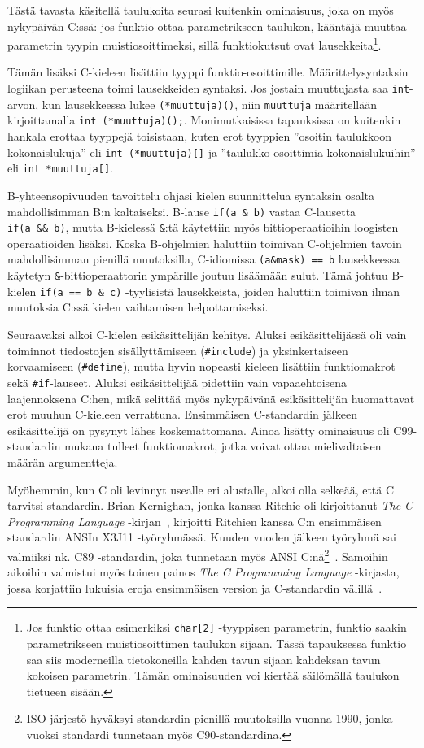Tästä tavasta käsitellä taulukoita seurasi kuitenkin ominaisuus, joka on myös
nykypäivän C:ssä: jos funktio ottaa parametrikseen taulukon, kääntäjä muuttaa
parametrin tyypin muistiosoittimeksi, sillä funktiokutsut ovat
lausekkeita\footnote{Jos funktio ottaa esimerkiksi \texttt{char[2]} -tyyppisen
parametrin, funktio saakin parametrikseen muistiosoittimen taulukon sijaan.
Tässä tapauksessa funktio saa siis moderneilla tietokoneilla kahden tavun
sijaan kahdeksan tavun kokoisen parametrin. Tämän ominaisuuden voi kiertää
säilömällä taulukon tietueen sisään.}.

Tämän lisäksi C-kieleen lisättiin tyyppi funktio-osoittimille.
Määrittelysyntaksin logiikan perusteena toimi lausekkeiden syntaksi. Jos
jostain muuttujasta saa \texttt{int}-arvon, kun lausekkeessa lukee
\texttt{(*muuttuja)()}, niin \texttt{muuttuja} määritellään kirjoittamalla
\texttt{int~(*muuttuja)();}. Monimutkaisissa tapauksissa on kuitenkin hankala
erottaa tyyppejä toisistaan, kuten erot tyyppien ''osoitin taulukkoon
kokonaislukuja'' eli \texttt{int~(*muuttuja)[]} ja ''taulukko osoittimia
kokonaislukuihin'' eli \texttt{int~*muuttuja[]}.

B-yhteensopivuuden tavoittelu ohjasi kielen suunnittelua syntaksin osalta
mahdollisimman B:n kaltaiseksi. B-lause \texttt{if(a~\&~b)} vastaa C-lausetta
\texttt{if(a~\&\&~b)}, mutta B-kielessä \texttt{\&}:tä käytettiin myös
bittioperaatioihin loogisten operaatioiden lisäksi. Koska B-ohjelmien haluttiin
toimivan C-ohjelmien tavoin mahdollisimman pienillä muutoksilla, C-idiomissa
\texttt{(a\&mask)~==~b} lausekkeessa käytetyn \texttt{\&}-bittioperaattorin
ympärille joutuu lisäämään sulut. Tämä johtuu B-kielen \texttt{if(a == b \& c)}
-tyylisistä lausekkeista, joiden haluttiin toimivan ilman muutoksia C:ssä
kielen vaihtamisen helpottamiseksi.

Seuraavaksi alkoi C-kielen esikäsittelijän kehitys. Aluksi esikäsittelijässä
oli vain toiminnot tiedostojen sisällyttämiseen (\texttt{\#include}) ja
yksinkertaiseen korvaamiseen (\texttt{\#define}), mutta hyvin nopeasti
kieleen lisättiin funktiomakrot sekä \texttt{\#if}-lauseet. Aluksi
esikäsittelijää pidettiin vain vapaaehtoisena laajennoksena C:hen, mikä
selittää myös nykypäivänä esikäsittelijän huomattavat erot muuhun C-kieleen
verrattuna. Ensimmäisen C-standardin jälkeen esikäsittelijä on pysynyt lähes
koskemattomana. Ainoa lisätty ominaisuus oli C99-standardin mukana tulleet
funktiomakrot, jotka voivat ottaa mielivaltaisen määrän argumentteja.

Myöhemmin, kun C oli levinnyt usealle eri alustalle, alkoi olla selkeää, että C
tarvitsi standardin. Brian Kernighan, jonka kanssa Ritchie oli kirjoittanut
\emph{The C Programming Language} -kirjan~\citep{krfirst}, kirjoitti Ritchien
kanssa C:n ensimmäisen standardin ANSIn X3J11 -työryhmässä. Kuuden vuoden
jälkeen työryhmä sai valmiiksi nk. C89 -standardin, joka tunnetaan myös ANSI
C:nä\footnote{ISO-järjestö hyväksyi standardin pienillä muutoksilla vuonna
1990, jonka vuoksi standardi tunnetaan myös C90-standardina.}~\citep{C89}.
Samoihin aikoihin valmistui myös toinen painos \emph{The C Programming
Language} -kirjasta, jossa korjattiin lukuisia eroja ensimmäisen version ja
C-standardin välillä~\citep{krsecond}.

